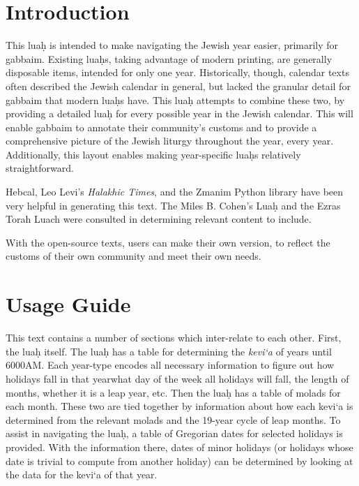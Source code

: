 \chapter{Introduction}

This lua\d{h} is intended to make navigating the Jewish year easier, primarily for gabbaim.  Existing lua\d{h}s, taking advantage of modern printing, are generally disposable items, intended for only one year. Historically, though, calendar texts often described the Jewish calendar in general, but lacked the granular detail for gabbaim that modern lua\d{h}s have.  This lua\d{h} attempts to combine these two, by providing a detailed lua\d{h} for every possible year in the Jewish calendar. This will enable gabbaim to annotate their community's customs and to provide a comprehensive picture of the Jewish liturgy throughout the year, every year.  Additionally, this layout enables making year-specific lua\d{h}s relatively straightforward.

Hebcal, Leo Levi's \textit{Halakhic Times}, and the Zmanim Python library have been very helpful in generating this text.  The Miles B. Cohen's Lua\d{h} and the Ezras Torah Luach were consulted in determining relevant content to include.

With the open-source texts, users can make their own version, to reflect the customs of their own community and meet their own needs.

\chapter{Usage Guide}

This text contains a number of sections which inter-relate to each other. First, the lua\d{h} itself. The lua\d{h} has a table for determining the \textit{kevi`a} of years until 6000AM. Each year-type encodes all necessary information to figure out how holidays fall in that year\textemdash what day of the week all holidays will fall, the length of months, whether it is a leap year, etc. Then the lua\d{h} has a table of molads for each month. These two are tied together by information about how each kevi`a is determined from the relevant molads and the 19-year cycle of leap months. To assist in navigating the lua\d{h}, a table of Gregorian dates for selected holidays is provided. With the information there, dates of minor holidays (or holidays whose date is trivial to compute from another holiday) can be determined by looking at the data for the kevi`a of that year.

